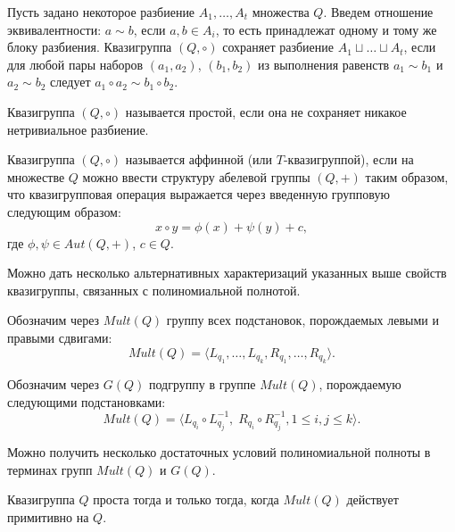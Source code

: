     \begin{definition}
        Пусть задано некоторое разбиение $A_1, \ldots, A_t$ множества $Q$.
        Введем отношение эквивалентности: $a \sim b$, если $a, b \in A_i$, то есть принадлежат одному и тому же блоку разбиения.
        Квазигруппа $(Q, \circ)$ сохраняет разбиение $A_1 \sqcup \ldots \sqcup A_t$, если для любой пары наборов $(a_1, a_2)$, $(b_1, b_2)$ из выполнения равенств $a_1 \sim b_1$ и $a_2 \sim b_2$ следует $a_1 \circ a_2 \sim b_1 \circ b_2$. 
    \end{definition}

    \begin{definition}
        Квазигруппа $(Q, \circ)$ называется простой, если она не сохраняет никакое нетривиальное разбиение.
    \end{definition}

    \begin{definition}
        Квазигруппа $(Q, \circ)$ называется аффинной (или $T$-квазигруппой), если на множестве $Q$ можно ввести структуру абелевой группы $(Q, +)$ таким образом, что квазигрупповая операция выражается через введенную групповую следующим образом:
        \[
            x \circ y = \phi(x) + \psi(y) + c,
        \]
        где $\phi, \psi \in Aut(Q, +)$, $c \in Q$.
    \end{definition}

    Можно дать несколько альтернативных характеризаций указанных выше свойств квазигруппы, связанных с полиномиальной полнотой.

    \begin{definition}
        Обозначим через $Mult(Q)$ группу всех подстановок, порождаемых левыми и правыми сдвигами:
        \[
            Mult(Q) = \langle L_{q_1}, \ldots, L_{q_k}, R_{q_1}, \ldots, R_{q_k} \rangle.
        \]
    \end{definition}

    \begin{definition}
        Обозначим через $G(Q)$ подгруппу в группе $Mult(Q)$, порождаемую следующими подстановками:
        \[
            Mult(Q) = \langle L_{q_i} \circ L_{q_j}^{-1}, \; R_{q_i} \circ R_{q_j}^{-1}, 1 \le i, j \le k \rangle.
        \]
    \end{definition}

    Можно получить несколько достаточных условий полиномиальной полноты в терминах групп $Mult(Q)$ и $G(Q)$.

    \begin{theorem}
        Квазигруппа $Q$ проста тогда и только тогда, когда $Mult(Q)$ действует примитивно на $Q$.
    \end{theorem}

